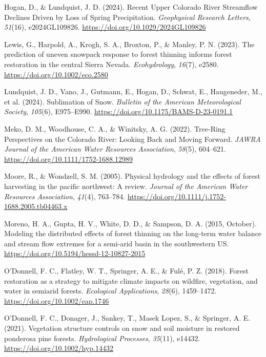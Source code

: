 \documentclass[
]{agujournal2019}
\newlength{\cslhangindent}
\newenvironment{CSLReferences}[2] %
 {\begin{list}{}{%
  \setlength{\itemindent}{0pt}
  \setlength{\leftmargin}{0pt}
  \setlength{\parsep}{0pt}
  \ifodd #1
   \setlength{\leftmargin}{\cslhangindent}
   \setlength{\itemindent}{-1\cslhangindent}
  \fi
  \setlength{\itemsep}{#2\baselineskip}}}
 {\end{list}}
\begin{document}
\begin{CSLReferences}{1}{0}
Hogan, D., \& Lundquist, J. D. (2024). Recent {Upper} {Colorado} {River}
{Streamflow} {Declines} {Driven} by {Loss} of {Spring} {Precipitation}.
\emph{Geophysical Research Letters}, \emph{51}(16), e2024GL109826.
\url{https://doi.org/10.1029/2024GL109826}

Lewis, G., Harpold, A., Krogh, S. A., Broxton, P., \& Manley, P. N.
(2023). The prediction of uneven snowpack response to forest thinning
informs forest restoration in the central {Sierra} {Nevada}.
\emph{Ecohydrology}, \emph{16}(7), e2580.
\url{https://doi.org/10.1002/eco.2580}

Lundquist, J. D., Vano, J., Gutmann, E., Hogan, D., Schwat, E.,
Haugeneder, M., et al. (2024). Sublimation of {Snow}. \emph{Bulletin of
the American Meteorological Society}, \emph{105}(6), E975--E990.
\url{https://doi.org/10.1175/BAMS-D-23-0191.1}

Meko, D. M., Woodhouse, C. A., \& Winitsky, A. G. (2022). Tree‐{Ring}
{Perspectives} on the {Colorado} {River}: {Looking} {Back} and {Moving}
{Forward}. \emph{JAWRA Journal of the American Water Resources
Association}, \emph{58}(5), 604--621.
\url{https://doi.org/10.1111/1752-1688.12989}

Moore, R., \& Wondzell, S. M. (2005). Physical hydrology and the effects
of forest harvesting in the pacific northwest: {A} review. \emph{Journal
of the American Water Resources Association}, \emph{41}(4), 763--784.
\url{https://doi.org/10.1111/j.1752-1688.2005.tb04463.x}

Moreno, H. A., Gupta, H. V., White, D. D., \& Sampson, D. A. (2015,
October). Modeling the distributed effects of forest thinning on the
long-term water balance and stream flow extremes for a semi-arid basin
in the southwestern {US}.
\url{https://doi.org/10.5194/hessd-12-10827-2015}

O'Donnell, F. C., Flatley, W. T., Springer, A. E., \& Fulé, P. Z.
(2018). Forest restoration as a strategy to mitigate climate impacts on
wildfire, vegetation, and water in semiarid forests. \emph{Ecological
Applications}, \emph{28}(6), 1459--1472.
\url{https://doi.org/10.1002/eap.1746}

O'Donnell, F. C., Donager, J., Sankey, T., Masek Lopez, S., \& Springer,
A. E. (2021). Vegetation structure controls on snow and soil moisture in
restored ponderosa pine forests. \emph{Hydrological Processes},
\emph{35}(11), e14432. \url{https://doi.org/10.1002/hyp.14432}


\end{CSLReferences}
\end{document}
